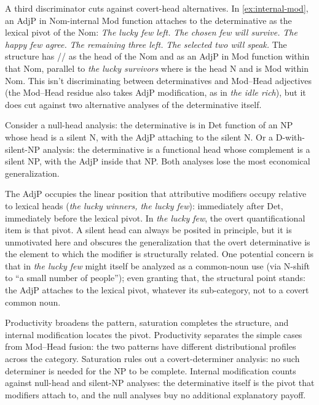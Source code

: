 \documentclass[12pt]{article}
\begin{document}
A third discriminator cuts against covert-head alternatives. In \ref{ex:internal-mod}, an AdjP in Nom-internal Mod function attaches to the determinative as the lexical pivot of the Nom:
\ea\label{ex:internal-mod}
\ea \textit{The lucky few left.}
\ex \textit{The chosen few will survive.}
\ex \textit{The happy few agree.}
\ex \textit{The remaining three left.}
\ex \textit{The selected two will speak.}
\z
\z
The structure has // as the head of the Nom and  as an AdjP in Mod function within that Nom, parallel to \textit{the lucky survivors} where  is the head N and  is Mod within Nom. This isn't discriminating between determinatives and Mod--Head adjectives (the Mod--Head residue also takes AdjP modification, as in \textit{the idle rich}), but it does cut against two alternative analyses of the determinative itself.

Consider a null-head analysis: the determinative is in Det function of an NP whose head is a silent N, with the AdjP attaching to the silent N. Or a D-with-silent-NP analysis: the determinative is a functional head whose complement is a silent NP, with the AdjP inside that NP. Both analyses lose the most economical generalization.

The AdjP occupies the linear position that attributive modifiers occupy relative to lexical heads (\textit{the lucky winners, the lucky few}): immediately after Det, immediately before the lexical pivot. In \textit{the lucky few}, the overt quantificational item is that pivot. A silent head can always be posited in principle, but it is unmotivated here and obscures the generalization that the overt determinative is the element to which the modifier is structurally related. One potential concern is that  in \textit{the lucky few} might itself be analyzed as a common-noun use (via N-shift to \enquote{a small number of people}); even granting that, the structural point stands: the AdjP attaches to the lexical pivot, whatever its sub-category, not to a covert common noun.

Productivity broadens the pattern, saturation completes the structure, and internal modification locates the pivot. Productivity separates the simple cases from Mod--Head fusion: the two patterns have different distributional profiles across the category. Saturation rules out a covert-determiner analysis: no such determiner is needed for the NP to be complete. Internal modification counts against null-head and silent-NP analyses: the determinative itself is the pivot that modifiers attach to, and the null analyses buy no additional explanatory payoff.
\end{document}
